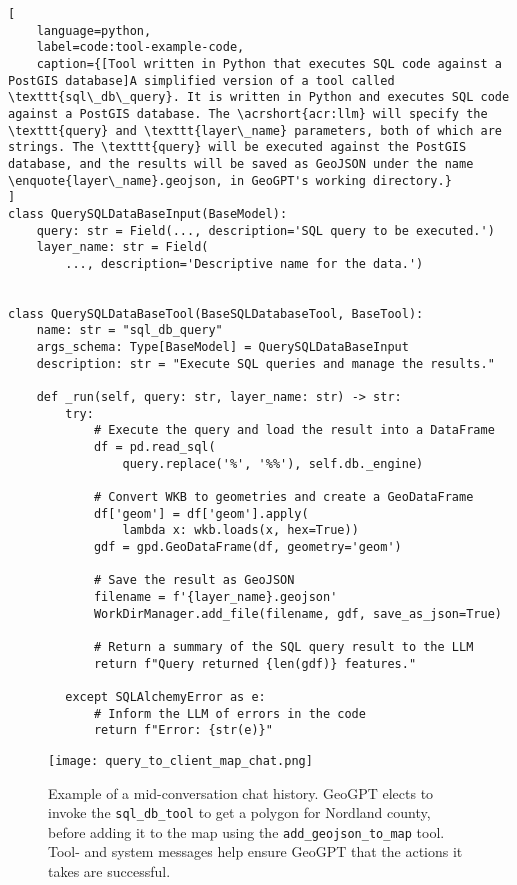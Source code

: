 \begin{lstlisting}[
    language=python,
    label=code:tool-example-code,
    caption={[Tool written in Python that executes SQL code against a PostGIS database]A simplified version of a tool called \texttt{sql\_db\_query}. It is written in Python and executes SQL code against a PostGIS database. The \acrshort{acr:llm} will specify the \texttt{query} and \texttt{layer\_name} parameters, both of which are strings. The \texttt{query} will be executed against the PostGIS database, and the results will be saved as GeoJSON under the name \enquote{layer\_name}.geojson, in GeoGPT's working directory.} 
]
class QuerySQLDataBaseInput(BaseModel):
    query: str = Field(..., description='SQL query to be executed.')
    layer_name: str = Field(
        ..., description='Descriptive name for the data.')


class QuerySQLDataBaseTool(BaseSQLDatabaseTool, BaseTool):
    name: str = "sql_db_query"
    args_schema: Type[BaseModel] = QuerySQLDataBaseInput
    description: str = "Execute SQL queries and manage the results."

    def _run(self, query: str, layer_name: str) -> str:
        try:
            # Execute the query and load the result into a DataFrame
            df = pd.read_sql(
                query.replace('%', '%%'), self.db._engine)

            # Convert WKB to geometries and create a GeoDataFrame
            df['geom'] = df['geom'].apply(
                lambda x: wkb.loads(x, hex=True))
            gdf = gpd.GeoDataFrame(df, geometry='geom')

            # Save the result as GeoJSON
            filename = f'{layer_name}.geojson'
            WorkDirManager.add_file(filename, gdf, save_as_json=True)

            # Return a summary of the SQL query result to the LLM
            return f"Query returned {len(gdf)} features."

        except SQLAlchemyError as e:
            # Inform the LLM of errors in the code
            return f"Error: {str(e)}"
\end{lstlisting}


\begin{figure}
    \centering
    \texttt{[image: query\_to\_client\_map\_chat.png]}
    \caption[Example of a chat history]{Example of a mid-conversation chat history. GeoGPT elects to invoke the \texttt{sql\_db\_tool} to get a polygon for Nordland county, before adding it to the map using the \texttt{add\_geojson\_to\_map} tool. Tool- and system messages help ensure GeoGPT that the actions it takes are successful.}
    \label{fig:chat-trace-example}
\end{figure}


